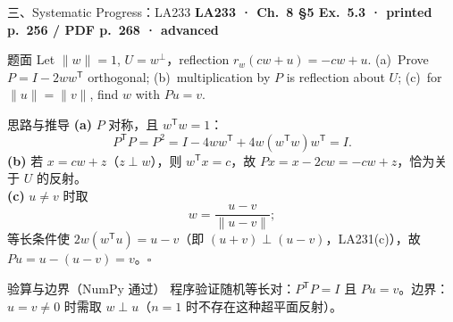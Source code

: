 \documentclass[aspectratio=169,10pt,fontset=none]{ctexbeamer}
\newcommand{\ex}[1]{\textcolor{accent}{\footnotesize\bfseries #1}}
\begin{document}
\begin{frame}[t]{三、Systematic Progress：LA233}
  \leavevmode\ex{LA233 · Ch.~8 §5 Ex.~5.3 · printed p.~256 / PDF p.~268 · advanced}
  \begin{block}{\footnotesize 题面}
    \scriptsize Let $\lVert w\rVert=1$, $U=w^\perp$，reflection $r_w(cw+u)=-cw+u$. (a)~Prove $P=I-2ww^{\mathsf T}$ orthogonal; (b)~multiplication by $P$ is reflection about $U$; (c)~for $\lVert u\rVert=\lVert v\rVert$, find $w$ with $Pu=v$.
  \end{block}
  \begin{exampleblock}{\footnotesize 思路与推导}
    \scriptsize
    \textbf{(a)} $P$ 对称，且 $w^{\mathsf T}w=1$：
    $$P^{\mathsf T}P=P^2=I-4ww^{\mathsf T}+4w(w^{\mathsf T}w)w^{\mathsf T}=I.$$
    \textbf{(b)} 若 $x=cw+z$（$z\perp w$），则 $w^{\mathsf T}x=c$，故 $Px=x-2cw=-cw+z$，恰为关于 $U$ 的反射。\\
    \textbf{(c)} $u\ne v$ 时取
    $$\boxed{w=\frac{u-v}{\lVert u-v\rVert}};$$
    等长条件使 $2w(w^{\mathsf T}u)=u-v$（即 $(u+v)\perp(u-v)$，LA231(c)），故 $Pu=u-(u-v)=v$。$\square$
  \end{exampleblock}
  \begin{block}{\footnotesize 验算与边界（NumPy 通过）}
    \scriptsize 程序验证随机等长对：$P^{\mathsf T}P=I$ 且 $Pu=v$。边界：$u=v\ne0$ 时需取 $w\perp u$（$n=1$ 时不存在这种超平面反射）。
  \end{block}
\end{frame}
\end{document}
